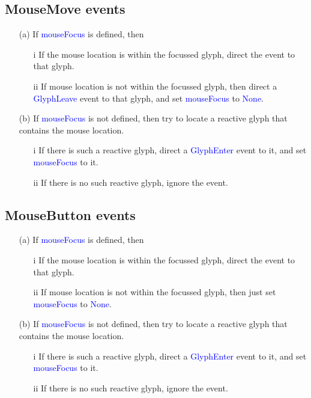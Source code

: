 \documentclass[12pt,a4paper]{article}
\def\Scala#1{\textcolor{blue}{\textsf{#1}}}
\def\SS#1{\subsection{#1}}
\begin{document}
\SS{MouseMove events}
  \begin{itemize}
    \item[(a)] If \Scala{mouseFocus} is defined, then
    \begin{itemize}
        \item[i] If the mouse location is within the focussed glyph, direct the
        event to that glyph.
        \item[ii] If mouse location is not within the focussed glyph, then direct a
        \Scala{GlyphLeave} event to that glyph, and set \Scala{mouseFocus} to \Scala{None}.
    \end{itemize}
    \item[(b)] If \Scala{mouseFocus} is not defined, then try to locate a reactive glyph
               that contains the mouse location.
              \begin{itemize}
                  \item[i] If there is such a reactive glyph, direct a \Scala{GlyphEnter}
                        event to it, and set \Scala{mouseFocus} to it.
                  \item[ii] If there is no such reactive glyph, ignore the event.
              \end{itemize}
  \end{itemize}

  
\SS{MouseButton events}
\begin{itemize}
    \item[(a)] If \Scala{mouseFocus} is defined, then
    \begin{itemize}
        \item[i] If the mouse location is within the focussed glyph, direct the
        event to that glyph.
        \item[ii] If mouse location is not within the focussed glyph, then
        just set \Scala{mouseFocus} to \Scala{None}.
    \end{itemize}
    \item[(b)] If \Scala{mouseFocus} is not defined, then try to locate a reactive glyph
               that contains the mouse location.
              \begin{itemize}
                  \item[i] If there is such a reactive glyph, direct a \Scala{GlyphEnter}
                        event to it, and set \Scala{mouseFocus} to it.
                  \item[ii] If there is no such reactive glyph, ignore the event.
              \end{itemize}
  \end{itemize}
\end{document}
